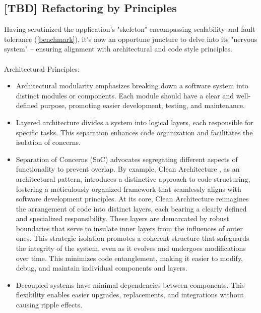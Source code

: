 
\subsection{[TBD] Refactoring by Principles}

Having scrutinized the application's "skeleton" encompassing scalability and fault tolerance (\ref{benchmark}), it's 
now an opportune juncture to delve into its "nervous system" -- ensuring alignment with architectural and code style 
principles.\\
\\

\noindent Architectural Principles:

\begin{itemize}
  \item Architectural modularity \cite{Rich20} emphasizes breaking down a software system into distinct modules or 
  components. Each module should have a clear and well-defined purpose, promoting easier development, testing, and 
  maintenance.

  \item Layered architecture \cite{Rich22} divides a system into logical layers, each responsible for specific tasks. 
  This separation enhances code organization and facilitates the isolation of concerns.

  \item Separation of Concerns (SoC) advocates segregating different aspects of functionality to prevent overlap. By 
  example, Clean Architecture \cite{Mart18}, as an architectural pattern, introduces a distinctive approach to code 
  structuring, fostering a meticulously organized framework that seamlessly aligns with software development principles. 
  At its core, Clean Architecture reimagines the arrangement of code into distinct layers, each bearing a clearly 
  defined and specialized responsibility. These layers are demarcated by robust boundaries that serve to insulate 
  inner layers from the influences of outer ones. This strategic isolation promotes a coherent structure that safeguards 
  the integrity of the system, even as it evolves and undergoes modifications over time. This minimizes code 
  entanglement, making it easier to modify, debug, and maintain individual components and layers.

  \item Decoupled systems \cite{Kass05} have minimal dependencies between components. This flexibility enables easier 
  upgrades, replacements, and integrations without causing ripple effects.
\end{itemize}

